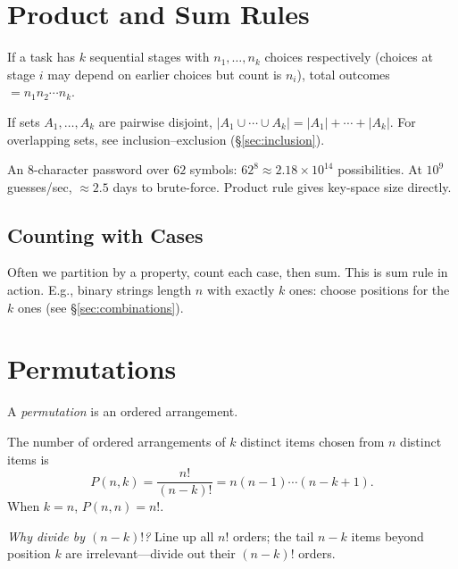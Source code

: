 \section{Product and Sum Rules}
\label{sec:product-sum}

\begin{theorem} If a task has $k$ sequential stages with $n_1,\dots,n_k$ choices respectively (choices at stage $i$ may depend on earlier choices but count is $n_i$), total outcomes $=n_1n_2\cdots n_k$.
\end{theorem}

\begin{theorem} If sets $A_1,\dots,A_k$ are pairwise disjoint, $|A_1\cup\cdots\cup A_k|=|A_1|+\cdots+|A_k|$. For overlapping sets, see inclusion--exclusion (\S\ref{sec:inclusion}).
\end{theorem}

\begin{example}[Passwords] An $8$-character password over $62$ symbols: $62^8\approx2.18\times10^{14}$ possibilities. At $10^9$ guesses/sec, $\approx2.5$ days to brute-force. Product rule gives key-space size directly.
\end{example}

\subsection{Counting with Cases}
Often we partition by a property, count each case, then sum. This is sum rule in action. E.g., binary strings length $n$ with exactly $k$ ones: choose positions for the $k$ ones (see \S\ref{sec:combinations}).

\section{Permutations}
\label{sec:permutations}
A \emph{permutation} is an ordered arrangement.

\begin{definition}[Permutation] The number of ordered arrangements of $k$ distinct items chosen from $n$ distinct items is
\[
P(n,k)=\frac{n!}{(n-k)!}=n(n-1)\cdots(n-k+1).
\]
When $k=n$, $P(n,n)=n!$.
\end{definition}

\emph{Why divide by $(n-k)!$?} Line up all $n!$ orders; the tail $n-k$ items beyond position $k$ are irrelevant---divide out their $(n-k)!$ orders.

